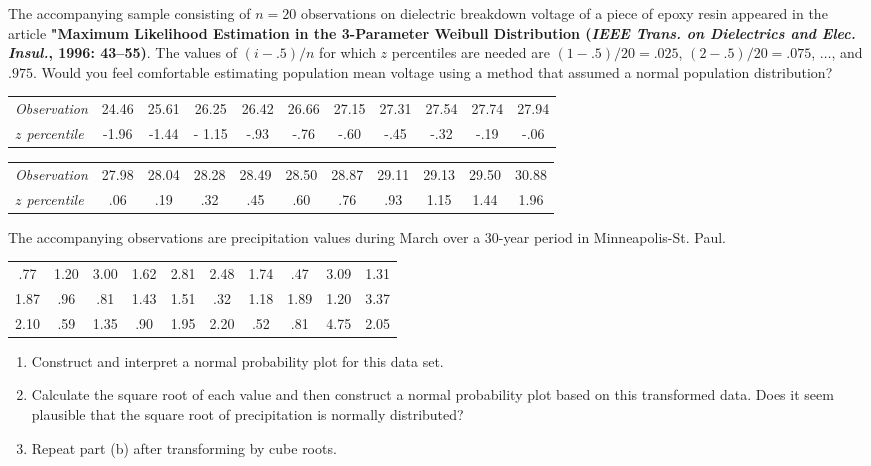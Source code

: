 \documentclass[11pt,letterpaper,boxed]{hmcpset}
\begin{document}
\begin{problem}[4.6.89]
	The accompanying sample consisting of $n = 20$ observations on dielectric breakdown voltage of a piece of epoxy resin appeared in the article \textbf{"Maximum Likelihood Estimation in the 3-Parameter Weibull Distribution (\emph{IEEE Trans. on Dielectrics and Elec. Insul.}, 1996: 43--55)}. The values of $(i - .5)/n$ for which $z$ percentiles are needed are $(1 - .5)/20 = .025$, $(2 - .5)/20 = .075$, $\dots$, and $.975$. Would you feel comfortable estimating population mean voltage using a method that assumed a normal population distribution?
	\begin{center}
	\begin{tabular}{l c c c c c c c c c c}
		\textit{Observation} & 24.46& 25.61 & 26.25 & 26.42 & 26.66 & 27.15 & 27.31 & 27.54 & 27.74 & 27.94\\
		\textit{$z$ percentile} & -1.96 & -1.44 & - 1.15 & -.93 & -.76 & -.60 & -.45 & -.32 & -.19 & -.06
	\end{tabular}
	\begin{tabular}{l c c c c c c c c c c}
		\textit{Observation} & 27.98 & 28.04 & 28.28 & 28.49 & 28.50 & 28.87 & 29.11 & 29.13 & 29.50 & 30.88\\
		\textit{$z$ percentile}& .06 & .19 & .32 & .45 & .60 & .76 & .93 & 1.15 & 1.44 & 1.96
	\end{tabular}
	\end{center}
\end{problem}

\begin{solution}
	\vfill
\end{solution}
\newpage


\begin{problem}[4.6.94]
	The accompanying observations are precipitation values during March over a 30-year period in Minneapolis-St. Paul.
	\begin{center}
	\begin{tabular}{c c c c c c c c c c}
		.77 & 1.20 & 3.00 & 1.62 & 2.81 & 2.48 & 1.74 & .47 & 3.09 & 1.31\\
		 1.87 & .96 & .81 & 1.43 & 1.51 & .32 & 1.18 & 1.89 & 1.20 & 3.37\\
		 2.10 & .59 & 1.35 & .90 & 1.95 & 2.20 & .52 & .81 & 4.75 & 2.05
	\end{tabular}
	\end{center}
	\begin{enumerate}
		\item
			Construct and interpret a normal probability plot for this data set.
		\item
			Calculate the square root of each value and then construct a normal probability plot based on this transformed data. Does it seem plausible that the square root of precipitation is normally distributed?
		\item
			Repeat part (b) after transforming by cube roots.
	\end{enumerate}
\end{problem}
\end{document}
